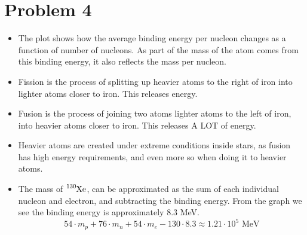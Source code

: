 \documentclass{article}
\begin{document}
\section*{Problem 4}
\begin{itemize}
  \item The plot shows how the average binding energy per nucleon changes as a function of number of nucleons. As part of the mass of the atom comes from this binding energy, it also reflects the mass per nucleon. 
  \item Fission is the process of splitting up heavier atoms to the right of iron into lighter atoms closer to iron. This releases energy. 
  \item Fusion is the process of joining two atoms lighter atoms to the left of iron, into heavier atoms closer to iron. This releases A LOT of energy. 
  \item Heavier atoms are created under extreme conditions inside stars, as fusion has high energy requirements, and even more so when doing it to heavier atoms. 
  \item The mass of $\ce{_{}^{130}\text{Xe}_{}}$, can be approximated as the sum of each individual nucleon and electron, and subtracting the binding energy. From the graph we see the binding energy is approximately 8.3 MeV. 
  \begin{equation}
    54 ⋅  m_p + 76 ⋅ m_n + 54 ⋅ m_e - 130 ⋅ 8.3 ≈ 1.21 ⋅ 10^{5} \text{ MeV}
  \end{equation}
\end{itemize}
\end{document}
